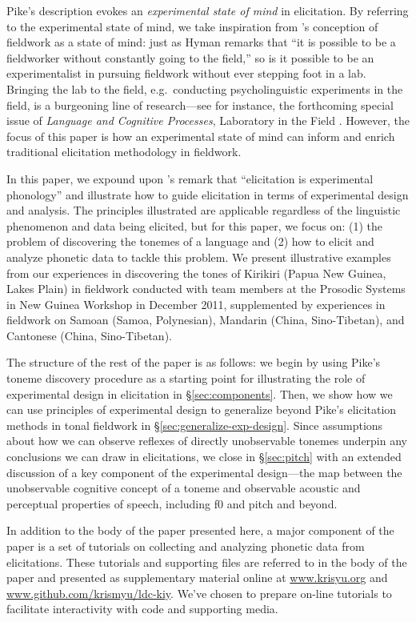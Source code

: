 \documentclass[12pt]{article}
\begin{document}
Pike's description evokes an \textit{experimental state of mind} in
elicitation.  By referring to the experimental state of mind, we take inspiration
 from \citet{Hyman:2001}'s conception of fieldwork as a state of
 mind: just as Hyman remarks that ``it is possible to be a
fieldworker without constantly going to the field,'' so is it
possible to be an experimentalist in pursuing fieldwork without ever
stepping foot in a lab. Bringing the lab to the field, e.g.\
conducting psycholinguistic experiments in the field, is a burgeoning
line of research---see for instance, the forthcoming special issue of
\textit{Language and Cognitive Processes}, Laboratory in the Field \citet{Jaeger:2014}. However, the
focus of this paper is how an experimental state of mind can
inform and enrich traditional elicitation methodology in fieldwork.

 In this paper, we expound upon \citet{Hyman:2007}'s
remark that ``elicitation is experimental phonology'' and illustrate
how to guide elicitation in terms of experimental design and
analysis. The principles illustrated are applicable regardless of the
linguistic phenomenon and data being elicited, but for this paper, we
focus on: (1) the problem of discovering the tonemes of a language and
(2) how to elicit and analyze phonetic data to tackle this problem. We
present illustrative examples from our experiences in
discovering the tones of Kirikiri (Papua New Guinea, Lakes Plain) in
fieldwork conducted with team members at the Prosodic Systems in New
Guinea Workshop in December 2011, supplemented by experiences in
fieldwork on Samoan (Samoa, Polynesian), Mandarin (China,
Sino-Tibetan), and Cantonese (China, Sino-Tibetan).

 The structure of the rest of the paper is as follows: we begin by
 using Pike's toneme discovery procedure as a starting point for
 illustrating the role of experimental design in elicitation in
 \S\ref{sec:components}. Then, we show how we can use principles of
 experimental design to generalize beyond Pike's elicitation methods
 in tonal fieldwork in \S\ref{sec:generalize-exp-design}. Since
 assumptions about how we can observe reflexes of directly
 unobservable tonemes underpin any conclusions we can draw
 in elicitations, we close in \S\ref{sec:pitch}
 with an extended discussion of a key component of the experimental design---the map between the unobservable
 cognitive concept of a toneme and observable acoustic and perceptual
 properties of speech, including f0 and pitch and beyond. 

In addition to the body of the paper presented here, a major component
of the paper is a set of tutorials on collecting and analyzing
phonetic data from elicitations. These tutorials and supporting files
are referred to in the body of the paper and presented as supplementary
material online at \url{www.krisyu.org} and
\url{www.github.com/krismyu/ldc-kiy}. We've chosen to prepare on-line
tutorials to facilitate interactivity with code and supporting media.
\end{document}
